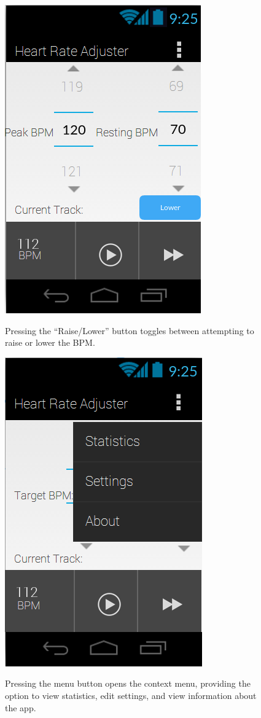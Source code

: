 \documentclass[letterpaper,english, 12pt]{scrreprt}
\begin{document}
\begin{figure}[H]
	\centering
	\includegraphics{img/mobile_ui/2.png}\\
	\caption{Pressing the ``Raise/Lower'' button toggles between attempting to raise or lower the BPM.}
\end{figure}

\begin{figure}[H]
	\centering
	\includegraphics{img/mobile_ui/3.png}\\
	\caption{Pressing the menu button opens the context menu, providing the option to view statistics, edit settings, and view information about the app.}
\end{figure}
\end{document}
